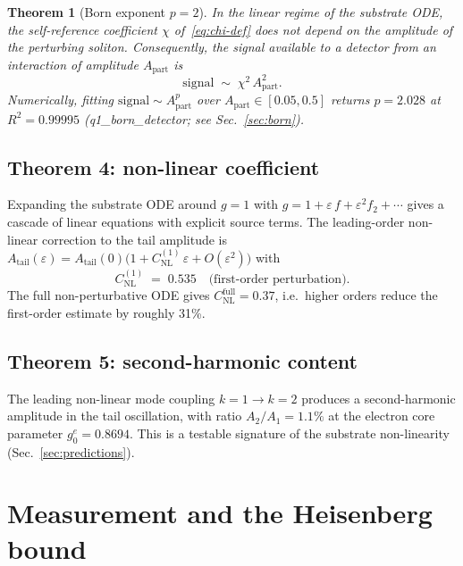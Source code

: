 \documentclass[11pt,a4paper]{article}
\newcommand{\Atail}{A_{\mathrm{tail}}}
\newcommand{\ApartSym}{A_{\mathrm{part}}}
\newcommand{\chiTGP}{\chi}
\newcommand{\eps}{\varepsilon}
\newtheorem{theorem}{Theorem}
\begin{document}
\begin{theorem}[Born exponent $p=2$]\label{thm:born-exponent}
In the linear regime of the substrate ODE, the self-reference
coefficient $\chiTGP$ of~\eqref{eq:chi-def} does \emph{not} depend on
the amplitude of the perturbing soliton. Consequently, the signal
available to a detector from an interaction of amplitude
$\ApartSym$ is
\begin{equation}\label{eq:born-structural}
  \text{signal} \;\sim\; \chiTGP^{2}\,\ApartSym^{2}.
\end{equation}
Numerically, fitting $\text{signal}\sim\ApartSym^{p}$ over
$\ApartSym\in[0.05,0.5]$ returns $p=2.028$ at $R^{2}=0.99995$
(q1\_born\_detector; see Sec.~\ref{sec:born}).
\end{theorem}

\subsection{Theorem 4: non-linear coefficient}

Expanding the substrate ODE around $g=1$ with $g=1+\eps\,f+\eps^{2}f_{2}+\cdots$
gives a cascade of linear equations with explicit source terms.
The leading-order non-linear correction to the tail amplitude is
$\Atail(\eps)=\Atail(0)\bigl(1+C_{\mathrm{NL}}^{(1)}\,\eps+O(\eps^{2})\bigr)$
with
\begin{equation}
  C_{\mathrm{NL}}^{(1)} \;=\; 0.535 \quad \text{(first-order perturbation)}.
\end{equation}
The full non-perturbative ODE gives $C_{\mathrm{NL}}^{\mathrm{full}}=0.37$,
i.e.\ higher orders reduce the first-order estimate by roughly 31\%.

\subsection{Theorem 5: second-harmonic content}

The leading non-linear mode coupling $k=1\to k=2$ produces a
second-harmonic amplitude in the tail oscillation, with ratio
$A_{2}/A_{1}=1.1\%$ at the electron core parameter
$g_{0}^{e}=0.8694$. This is a testable signature of the
substrate non-linearity (Sec.~\ref{sec:predictions}).

\section{Measurement and the Heisenberg bound}\label{sec:measurement}
\end{document}
